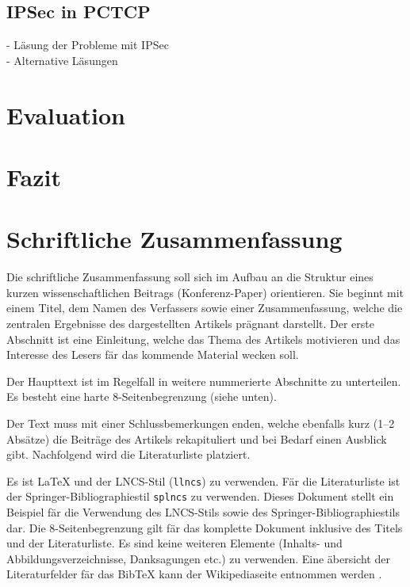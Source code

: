 \documentclass[fleqn,envcountsame,runningheads,10pt,a4paper]{llncs}
\begin{document}
\subsection{IPSec in PCTCP}
\label{sec:ipsecinpctcp}

- Läsung der Probleme mit IPSec\\
- Alternative Läsungen

\section{Evaluation}
\label{sec:evaluation}



\section{Fazit}
\label{sec:conclusion}



\section{Schriftliche Zusammenfassung}
\label{sec:zusam}

Die schriftliche Zusammenfassung soll sich im Aufbau an die Struktur eines kurzen wissenschaftlichen Beitrags (Konferenz-Paper) orientieren. Sie beginnt mit einem Titel, dem Namen des Verfassers sowie einer Zusammenfassung, welche die zentralen Ergebnisse des dargestellten Artikels prägnant darstellt. Der erste Abschnitt ist eine Einleitung, welche das Thema des Artikels motivieren und das Interesse des Lesers fär das kommende Material wecken soll.

Der Haupttext ist im Regelfall in weitere nummerierte Abschnitte zu unterteilen. Es besteht eine harte 8-Seitenbegrenzung (siehe unten).

Der Text muss mit einer Schlussbemerkungen enden, welche ebenfalls kurz (1--2 Absätze) die Beiträge des Artikels rekapituliert und bei Bedarf einen Ausblick gibt. Nachfolgend wird die Literaturliste platziert.

Es ist \LaTeX{} und der LNCS-Stil (\texttt{llncs}) zu verwenden. Fär die Literaturliste ist der Springer-Bibliographiestil \texttt{splncs} zu verwenden. Dieses Dokument stellt ein Beispiel fär die Verwendung des LNCS-Stils sowie des Springer-Bibliographiestils dar. Die 8-Seitenbegrenzung gilt fär das komplette Dokument inklusive des Titels und der Literaturliste. Es sind keine weiteren Elemente (Inhalts- und Abbildungsverzeichnisse, Danksagungen etc.) zu verwenden. Eine äbersicht der Literaturfelder fär das BibTeX kann der Wikipediaseite entnommen werden \cite{bibtex-wiki}.
\end{document}
